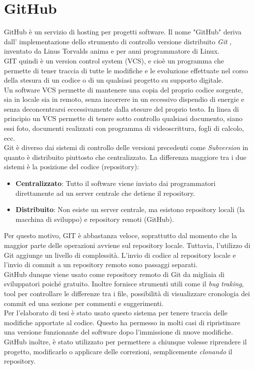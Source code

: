\section{GitHub}
\label{sec:github}
GitHub è un servizio di hosting per progetti software. Il nome "GitHub" deriva dall' implementazione dello strumento di controllo versione distribuito \textit{Git} \cite{git:wiki}, inventato da Linus Torvalds anima e per anni programmatore di Linux. 
\\ GIT quindi è un version control system (VCS), e cioè un programma che permette di tener traccia di tutte le modifiche e le evoluzione effettuate nel corso della stesura di un codice o di un qualsiasi progetto su supporto digitale.
\\ Un software VCS permette di mantenere una copia del proprio codice
sorgente, sia in locale sia in remoto, senza incorrere in un eccessivo dispendio di energie e senza deconcentrarsi eccessivamente dalla stesure del proprio testo. In linea di principio un VCS permette di tenere sotto controllo qualsiasi documento, siano essi foto, documenti realizzati con programma di videoscrittura, fogli di calcolo, ecc.
\\ Git è diverso dai sistemi di controllo delle versioni precedenti come \textit{Subversion} in quanto è distribuito piuttosto che centralizzato. La differenza maggiore tra i due sistemi è la posizione del codice (repository): 
\begin{itemize}
\item \textbf{Centralizzato}: Tutto il software viene inviato dai programmatori direttamente ad un server centrale che detiene il repository.
\item \textbf{Distribuito}: Non esiste un server centrale, ma esistono repository locali (la macchina di sviluppo) e repository remoti (GitHub).
\end{itemize}
Per questo motivo, GIT è abbastanza veloce, soprattutto dal momento che la maggior parte delle operazioni avviene sul repository locale. Tuttavia, l'utilizzo di Git aggiunge un livello di complessità. L'invio di codice al repository locale e l'invio di commit a un repository remoto sono passaggi separati.
\\ GitHub dunque viene usato come repository remoto di Git da migliaia di sviluppatori poiché gratuito. Inoltre fornisce strumenti utili come il \textit{bug traking}, tool per controllare le differenze tra i file, possibilità di visualizzare cronologia dei commit ed una sezione per commenti e suggerimenti.
\\ Per l'elaborato di tesi è stato usato questo sistema per tenere traccia delle modifiche apportate al codice. Questo ha permesso in molti casi di ripristinare una versione funzionante del software dopo l'immissione di nuove modifiche. GitHub inoltre, è stato utilizzato per permettere a chiunque volesse riprendere il progetto, modificarlo o applicare delle correzioni, semplicemente \textit{clonando} il repository.
